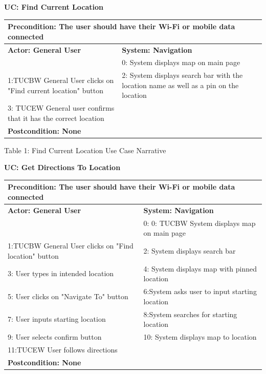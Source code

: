 \documentclass{article}
\begin{document}
	{
\noindent\textbf{UC: Find Current Location}
\begin{flushleft}
\begin{tabular}{ |p{7cm}|p{7cm}| } 
   \hline
  \multicolumn{2}{|p{\textwidth}|}{\textbf{Precondition:} The user should have their Wi-Fi or mobile data connected} \\
  \hline
\textbf {Actor: General User} & \textbf{System: Navigation}\\ 
\hline
 & 0: System displays map on main page\\ 
\hline
 1:TUCBW General User clicks on "Find current location" button & 2: System displays search bar with the location name as well as a pin on the location \\ 
\hline
3: TUCEW General user confirms that it has the correct location & \\
  \hline
  \multicolumn{2}{|p{\textwidth}|}{\textbf{Postcondition: None}} \\
   \hline

\end{tabular}

\end{flushleft}
\begin{center}
    	Table 1: Find Current Location Use Case Narrative
\end{center}

\noindent\textbf{UC: Get Directions To Location}
\begin{flushleft}
\begin{tabular}{  |p{7cm}|p{7cm}| } 
  \hline
  \multicolumn{2}{|p{\textwidth}|}{\textbf{Precondition:} The user should have their Wi-Fi or mobile data connected} \\
  \hline
 \textbf {Actor: General User} & \textbf{System: Navigation}\\ 
\hline 
 & 0: 0: TUCBW System displays map on main page\\ 
\hline
 1:TUCBW General User clicks on "Find location" button & 2: System displays search bar \\ 
\hline
3: User types in intended location & 4: System displays map with pinned location \\
 \hline
5: User clicks on "Navigate To" button & 6:System asks user to input starting location \\
 \hline
7: User inputs starting location & 8:System searches for starting location \\
 \hline
9: User selects confirm button & 10: System displays map to location \\
 \hline
11:TUCEW  User follows directions &  \\
  \hline
  \multicolumn{2}{|p{\textwidth}|}{\textbf{Postcondition: None}} \\
   \hline


\end{tabular}
\end{flushleft}}
\end{document}
